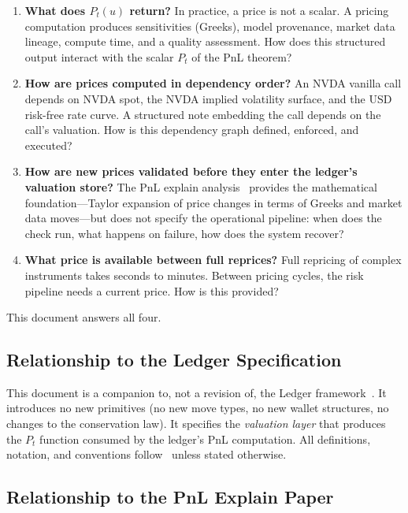 \documentclass[11pt,a4paper]{article}
\begin{document}
\begin{enumerate}
\item \textbf{What does $P_t(u)$ return?}  In practice, a price is not a scalar.  A pricing computation produces sensitivities (Greeks), model provenance, market data lineage, compute time, and a quality assessment.  How does this structured output interact with the scalar $P_t$ of the PnL theorem?

\item \textbf{How are prices computed in dependency order?}  An NVDA vanilla call depends on NVDA spot, the NVDA implied volatility surface, and the USD risk-free rate curve.  A structured note embedding the call depends on the call's valuation.  How is this dependency graph defined, enforced, and executed?

\item \textbf{How are new prices validated before they enter the ledger's valuation store?}  The PnL explain analysis~\cite{pnl_explain} provides the mathematical foundation---Taylor expansion of price changes in terms of Greeks and market data moves---but does not specify the operational pipeline: when does the check run, what happens on failure, how does the system recover?

\item \textbf{What price is available between full reprices?}  Full repricing of complex instruments takes seconds to minutes.  Between pricing cycles, the risk pipeline needs a current price.  How is this provided?
\end{enumerate}

This document answers all four.

\subsection{Relationship to the Ledger Specification}

This document is a companion to, not a revision of, the Ledger framework~\cite{ledger}.  It introduces no new primitives (no new move types, no new wallet structures, no changes to the conservation law).  It specifies the \emph{valuation layer} that produces the $P_t$ function consumed by the ledger's PnL computation.  All definitions, notation, and conventions follow~\cite{ledger} unless stated otherwise.

\subsection{Relationship to the PnL Explain Paper}
\end{document}
